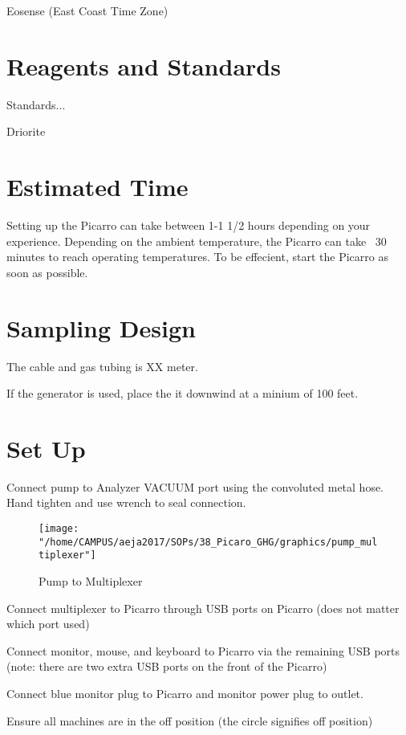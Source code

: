 \documentclass[12pt]{../SOP3}\usepackage[]{graphicx}\usepackage[]{color}
\begin{document}
\NP Eosense (East Coast Time Zone)


\section{Reagents and Standards}

\NP Standards..\cite{StandardMethods2012}.

\NP Driorite


\section{Estimated Time}

\NP Setting up the Picarro can take between 1-1 1/2 hours depending on your experience. Depending on the ambient temperature, the Picarro can take ~30 minutes to reach operating temperatures. To be effecient, start the Picarro as soon as possible.

\section{Sampling Design}

\NP The cable and gas tubing is XX meter.

\NP If the generator is used, place the it downwind at a minium of 100 feet.

\section{Set Up}

\NP Connect pump to Analyzer VACUUM port using the convoluted metal hose. Hand tighten and use wrench to seal connection.

\NP 
\begin{figure}[h]
\texttt{[image: "/home/CAMPUS/aeja2017/SOPs/38\_Picaro\_GHG/graphics/pump\_multiplexer"]}
\caption{Pump to Multiplexer}
\end{figure}


\NP Connect multiplexer to Picarro through USB ports on Picarro (does not matter which port used)

\NP Connect monitor, mouse, and keyboard to Picarro via the remaining USB ports (note: there are two extra USB ports on the front of the Picarro)

\NP Connect blue monitor plug to Picarro and monitor power plug to outlet.

\NP Ensure all machines are in the off position (the circle signifies off position)
\end{document}

